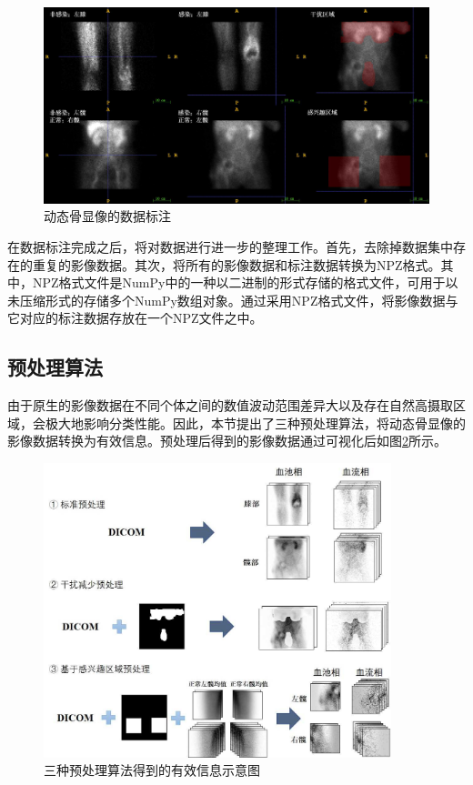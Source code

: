 \begin{figure}[htbp]
  \centering
  \includegraphics[width=\textwidth]{figures/chap03_label.jpg}
  \caption{动态骨显像的数据标注}
  \label{fig:chap03_label}
\end{figure}

在数据标注完成之后，将对数据进行进一步的整理工作。首先，去除掉数据集中存在的重复的影像数据。其次，将所有的影像数据和标注数据转换为NPZ格式。其中，NPZ格式文件是NumPy\cite{harris2020array}中的一种以二进制的形式存储的格式文件，可用于以未压缩形式的存储多个NumPy数组对象。通过采用NPZ格式文件，将影像数据与它对应的标注数据存放在一个NPZ文件之中。

\subsection{预处理算法}

由于原生的影像数据在不同个体之间的数值波动范围差异大以及存在自然高摄取区域，会极大地影响分类性能。因此，本节提出了三种预处理算法，将动态骨显像的影像数据转换为有效信息。预处理后得到的影像数据通过可视化后如图\ref{fig:chap03_algorithm}所示。

\begin{figure}
  \centering
  \includegraphics[width=0.9\textwidth]{figures/chap03_algorithm.jpg}
  \caption{三种预处理算法得到的有效信息示意图}
  \label{fig:chap03_algorithm}
\end{figure}

